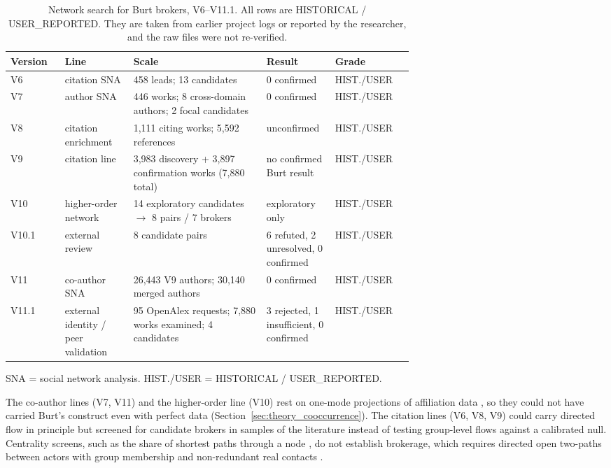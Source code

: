 \begin{table}[tbp]
  \centering
  \small
  \caption{Network search for Burt brokers, V6--V11.1. All rows are HISTORICAL / USER\_REPORTED. They are taken from earlier project logs or reported by the researcher, and the raw files were not re-verified.}
  \label{tab:network_lines}
  \setlength{\tabcolsep}{4pt}
  \begin{tabular}{l p{0.17\linewidth} p{0.33\linewidth} p{0.17\linewidth} l}
    \toprule
    Version & Line & Scale & Result & Grade \\
    \midrule
    V6 & citation SNA & 458 leads; 13 candidates & 0 confirmed & HIST./USER \\
    V7 & author SNA & 446 works; 8 cross-domain authors; 2 focal candidates & 0 confirmed & HIST./USER \\
    V8 & citation enrichment & 1,111 citing works; 5,592 references & unconfirmed & HIST./USER \\
    V9 & citation line & 3,983 discovery + 3,897 confirmation works (7,880 total) & no confirmed Burt result & HIST./USER \\
    V10 & higher-order network & 14 exploratory candidates $\rightarrow$ 8 pairs / 7 brokers & exploratory only & HIST./USER \\
    V10.1 & external review & 8 candidate pairs & 6 refuted, 2 unresolved, 0 confirmed & HIST./USER \\
    V11 & co-author SNA & 26,443 V9 authors; 30,140 merged authors & 0 confirmed & HIST./USER \\
    V11.1 & external identity / peer validation & 95 OpenAlex requests; 7,880 works examined; 4 candidates & 3 rejected, 1 insufficient, 0 confirmed & HIST./USER \\
    \bottomrule
  \end{tabular}

  \smallskip
  \raggedright\footnotesize SNA = social network analysis. HIST./USER = HISTORICAL / USER\_REPORTED.
\end{table}

The co-author lines (V7, V11) and the higher-order line (V10) rest on one-mode projections of affiliation data \citep{newman2001scientific}, so they could not have carried Burt's construct even with perfect data (Section~\ref{sec:theory_cooccurrence}). The citation lines (V6, V8, V9) could carry directed flow in principle but screened for candidate brokers in samples of the literature instead of testing group-level flows against a calibrated null. Centrality screens, such as the share of shortest paths through a node \citep{freeman1977set}, do not establish brokerage, which requires directed open two-paths between actors with group membership \citep{gould1989structures} and non-redundant real contacts \citep{burt1992structural}.

